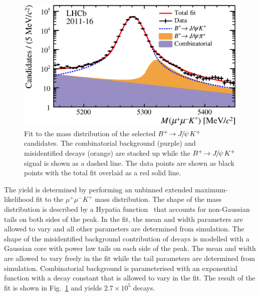 \begin{figure}[t]
\centering
\includegraphics[width=0.85\linewidth]{Figure_2.eps}
\caption{\small Fit to the mass distribution of the selected ${{{B}^+}}\!\rightarrow {\ensuremath{{J\mskip -3mu/\mskip -2mu\psi\mskip 2mu}}}{\ensuremath{{K}^+}}$ candidates. The combinatorial background (purple) and misidentified \decay{\Bp}{\jpsi\pip} decays (orange) are stacked up while the ${{{B}^+}}\!\rightarrow {\ensuremath{{J\mskip -3mu/\mskip -2mu\psi\mskip 2mu}}}{\ensuremath{{K}^+}}$ signal is shown as a dashed line. The data points are shown as black points with the total fit overlaid as a red solid line.}
\label{fig:cfit}
\end{figure}
The \decay{\Bp}{\jpsi\Kp} yield is determined by performing an unbinned extended
maximum-likelihood fit to the $\mu^{+} \mu^{-} K^{+}$ mass distribution.
The shape of the \mbox{\decay{\Bp}{\jpsi\Kp}} mass distribution is described by a
Hypatia function~\cite{Santos:2013gra} that accounts for non-Gaussian tails on both
sides of the peak. In the fit, the mean and width parameters are allowed
to vary and all other parameters are determined from simulation. The 
shape of the misidentified background contribution of \decay{\Bp}{\jpsi\pip} 
decays is modelled with a Gaussian core with power law tails on each 
side of the peak. The mean and width are allowed to vary freely in 
the fit while the tail parameters are determined from simulation.
Combinatorial background is parameterised with an exponential function
with a decay constant that is allowed to vary in the fit. The result of
the fit is shown in Fig.~\ref{fig:cfit} and yields $2.7\times 10^5$
\decay{\Bp}{\jpsi\Kp} decays.

